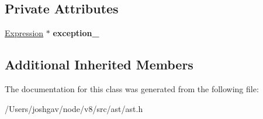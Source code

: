 \subsection*{Private Attributes}
\begin{DoxyCompactItemize}
\item 
\hyperlink{classv8_1_1internal_1_1_expression}{Expression} $\ast$ {\bfseries exception\+\_\+}\hypertarget{classv8_1_1internal_1_1_throw_ac40fe22039fc8372ef84187c33e5de73}{}\label{classv8_1_1internal_1_1_throw_ac40fe22039fc8372ef84187c33e5de73}

\end{DoxyCompactItemize}
\subsection*{Additional Inherited Members}


The documentation for this class was generated from the following file\+:\begin{DoxyCompactItemize}
\item 
/\+Users/joshgav/node/v8/src/ast/ast.\+h\end{DoxyCompactItemize}
